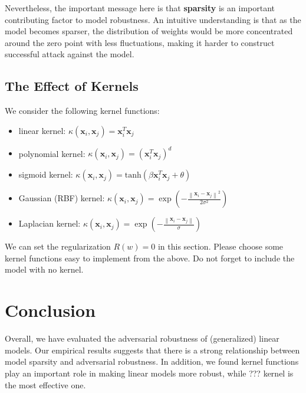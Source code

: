 \documentclass{article}
\newcommand{\fixme}[1]{{\color{red} #1}}
\begin{document}
Nevertheless, the important message here is that \textbf{sparsity} is an important contributing factor to model robustness. An intuitive understanding is that as the model becomes sparser, the distribution of weights would be more concentrated around the zero point with less fluctuations, making it harder to construct successful attack against the model.


\subsection{The Effect of Kernels}
We consider the following kernel functions:
\begin{itemize}
    \item linear kernel: $\kappa (\bm{x}_{i}, \bm{x}_{j})=\bm{x}_{i}^{T}\bm{x}_{j}$
    \item polynomial kernel: $\kappa (\bm{x}_{i}, \bm{x}_{j})=(\bm{x}_{i}^{T}\bm{x}_{j})^{d}$
    \item sigmoid kernel: $\kappa (\bm{x}_{i}, \bm{x}_{j})=\text{tanh}(\beta \bm{x}_{i}^{T}\bm{x}_{j} + \theta)$
    \item Gaussian (RBF) kernel: $\kappa \left(\bm{x}_{i}, \bm{x}_{j}\right)=\exp \left(-\frac{\left\|\bm{x}_{i}-\bm{x}_{j}\right\|^{2}}{2 \sigma^{2}}\right)$
    \item Laplacian kernel: $\kappa \left(\bm{x}_{i}, \bm{x}_{j}\right)=\exp \left(-\frac{\left\|\bm{x}_{i}-\bm{x}_{j}\right\|}{\sigma}\right)$
\end{itemize}

\fixme{We can set the regularization $R(w)=0$ in this section. Please choose some kernel functions easy to implement from the above. Do not forget to include the model with no kernel.}

\section{Conclusion}
Overall, we have evaluated the adversarial robustness of (generalized) linear models. Our empirical results suggests that there is a strong relationship between model sparsity and adversarial robustness. In addition, we found kernel functions play an important role in making linear models more robust, while \fixme{???} kernel is the most effective one.



\newpage


\end{document}
